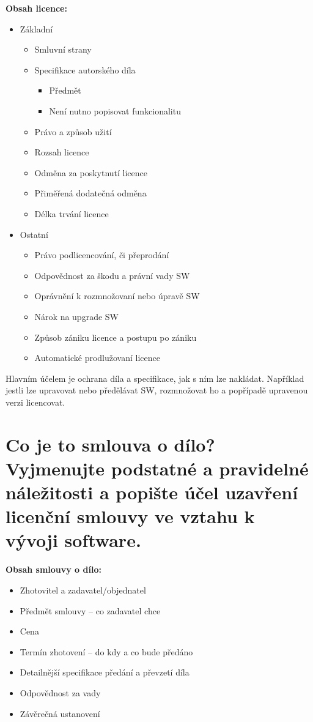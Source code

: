 \noindent\textbf{Obsah licence:}
\begin{itemize}[noitemsep]
    \item Základní
    \begin{itemize}[noitemsep]
        \item Smluvní strany
        \item Specifikace autorského díla
        \begin{itemize}[noitemsep]
            \item Předmět
            \item Není nutno popisovat funkcionalitu
        \end{itemize}
        \item Právo a způsob užití
        \item Rozsah licence
        \item Odměna za poskytnutí licence
        \item Přiměřená dodatečná odměna
        \item Délka trvání licence
    \end{itemize}
    \item Ostatní
    \begin{itemize}[noitemsep]
        \item Právo podlicencování, či přeprodání
        \item Odpovědnost za škodu a právní vady SW
        \item Oprávnění k rozmnožovaní nebo úpravě SW
        \item Nárok na upgrade SW
        \item Způsob zániku licence a postupu po zániku
        \item Automatické prodlužovaní licence
    \end{itemize}
\end{itemize}

Hlavním účelem je ochrana díla a specifikace, jak s ním lze nakládat. Například jestli lze upravovat nebo předělávat SW, rozmnožovat ho a popřípadě upravenou verzi licencovat. 


\section{Co je to smlouva o dílo? Vyjmenujte podstatné a pravidelné náležitosti a popište účel uzavření licenční smlouvy ve vztahu k vývoji software.}

\textbf{Obsah smlouvy o dílo:}
\begin{itemize}[noitemsep]
    \item Zhotovitel a zadavatel/objednatel
    \item Předmět smlouvy -- co zadavatel chce
    \item Cena
    \item Termín zhotovení -- do kdy a co bude předáno
    \item Detailnější specifikace předání a převzetí díla
    \item Odpovědnost za vady
    \item Závěrečná ustanovení
\end{itemize}

